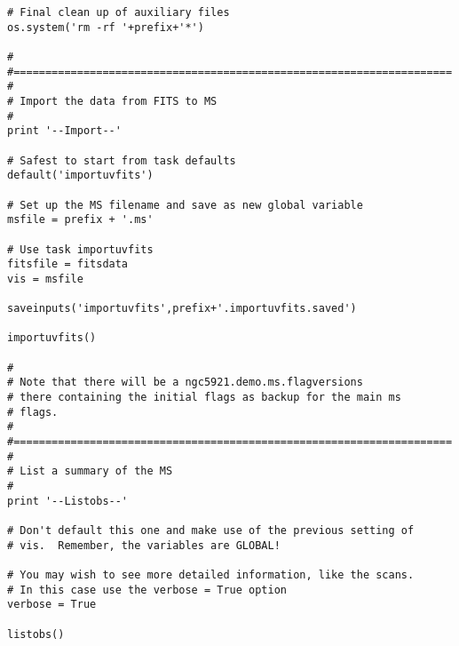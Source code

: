 \begin{verbatim}
# Final clean up of auxiliary files
os.system('rm -rf '+prefix+'*')

#
#=====================================================================
#
# Import the data from FITS to MS
#
print '--Import--'

# Safest to start from task defaults
default('importuvfits')

# Set up the MS filename and save as new global variable
msfile = prefix + '.ms'

# Use task importuvfits
fitsfile = fitsdata
vis = msfile

saveinputs('importuvfits',prefix+'.importuvfits.saved')

importuvfits()

#
# Note that there will be a ngc5921.demo.ms.flagversions
# there containing the initial flags as backup for the main ms
# flags.
#
#=====================================================================
#
# List a summary of the MS
#
print '--Listobs--'

# Don't default this one and make use of the previous setting of
# vis.  Remember, the variables are GLOBAL!

# You may wish to see more detailed information, like the scans.
# In this case use the verbose = True option
verbose = True

listobs()


\end{verbatim}
